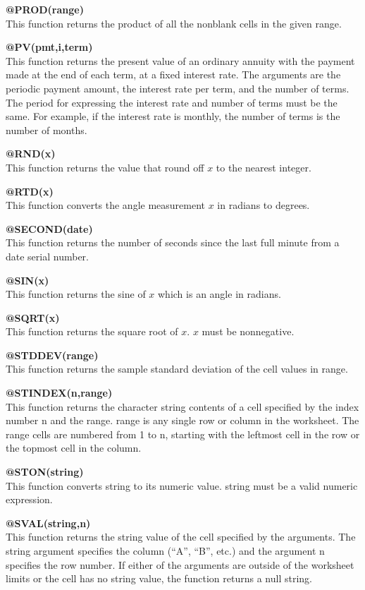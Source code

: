 {\bf @PROD(range)}\\
    This function returns the product of all the nonblank cells in the given 
range.

{\bf @PV(pmt,i,term)}\\
    This function returns the present value of an ordinary annuity with the 
payment made at the end of each term, at a fixed interest rate.  The arguments 
are the periodic payment amount, the interest rate per term, and the number of 
terms.  The period for expressing the interest rate and number of terms must 
be the same.  For example, if the interest rate is monthly, the number of 
terms is the number of months.

{\bf @RND(x)}\\
    This function returns the value that round off $x$ to the nearest integer.

{\bf @RTD(x)}\\
    This function converts the angle measurement $x$ in radians to degrees.

{\bf @SECOND(date)}\\
    This function returns the number of seconds since the last full minute 
from a date serial number.

{\bf @SIN(x)}\\
    This function returns the sine of $x$ which is an angle in radians.


{\bf @SQRT(x)}\\
    This function returns the square root of $x$.  $x$ must be nonnegative.

{\bf @STDDEV(range)}\\
    This function returns the sample standard deviation of the cell values in 
range.

{\bf @STINDEX(n,range)}\\
    This function returns the character string contents of a cell specified by 
the index number n and the range.  range is any single row or column in the 
worksheet.  The range cells are numbered from 1 to n, starting with the 
leftmost cell in the row or the topmost cell in the column.

{\bf @STON(string)}\\
    This function converts string to its numeric value.  string must be a 
valid numeric expression.

{\bf @SVAL(string,n)}\\
    This function returns the string value of the cell specified by the 
arguments.  The string argument specifies the column (``A'', ``B'', etc.) and the
argument n specifies the row number.  If either of the arguments are outside 
of the worksheet limits or the cell has no string value, the function returns 
a null string.

